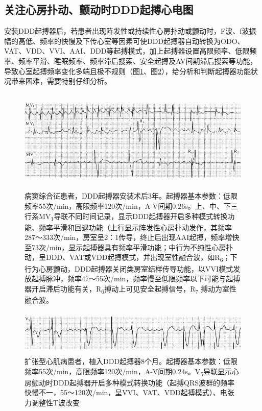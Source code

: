 \protect\hypertarget{text00045.htmlux5cux23subid499}{}{}

\subsection{关注心房扑动、颤动时DDD起搏心电图}

安装DDD起搏器后，若患者出现阵发性或持续性心房扑动或颤动时，F波、f波振幅的高低、频率的快慢及下传心室等因素可使DDD起搏器自动转换为ODO、VAT、VDD、VVI、AAI、DDD等起搏模式，加上起搏器设置高限频率、低限频率、频率平滑、睡眠频率、频率滞后搜索、安全起搏及AV间期滞后搜索等功能，导致心室起搏频率变化多端且极不规则（图\ref{fig38-35}、图\ref{fig38-36}），给分析和判断起搏器功能状况带来困难，需要特别仔细分析。

\begin{figure}[!htbp]
 \centering
 \includegraphics[width=5.58333in,height=1.94792in]{./images/Image00638.jpg}
 \captionsetup{justification=centering}
 \caption{病窦综合征患者，DDD起搏器安装术后3年。起搏器基本参数：低限频率55次/min，高限频率120次/min，A-V间期0.26s。上、中、下三行系MV\textsubscript{1}导联不同时间记录，显示DDD起搏器开启多种模式转换功能、频率平滑和回退功能（上行显示阵发性心房扑动发作，其频率287～333次/min，房室呈2：1传导，终止后出现AAI起搏，频率增快至73次/min，显示起搏器具有频率平滑功能；中行为不纯性心房扑动，呈DDD、VAT或VDD起搏模式，并出现室性融合波，如R\textsubscript{6}；下行为心房颤动，DDD起搏器关闭类房室结样传导功能，以VVI模式发放起搏脉冲，频率47～55次/min，频率慢至低限频率以下可能与起搏器开启滞后功能有关，R\textsubscript{6}搏动上可见安全起搏信号，R\textsubscript{7} 搏动为室性融合波。}
 \label{fig38-35}
  \end{figure} 


\begin{figure}[!htbp]
 \centering
 \includegraphics[width=5.58333in,height=0.85417in]{./images/Image00639.jpg}
 \captionsetup{justification=centering}
 \caption{扩张型心肌病患者，植入DDD起搏器8个月。起搏器基本参数：低限频率55次/min，高限频率120次/min，A-V间期0.24s。V\textsubscript{5}导联显示心房颤动时DDD起搏器开启多种模式转换功能（起搏QRS波群的频率快慢不一，55～120次/min，呈VVI、VAT、VDD起搏模式）、电张力调整性T波改变}
 \label{fig38-36}
  \end{figure} 


